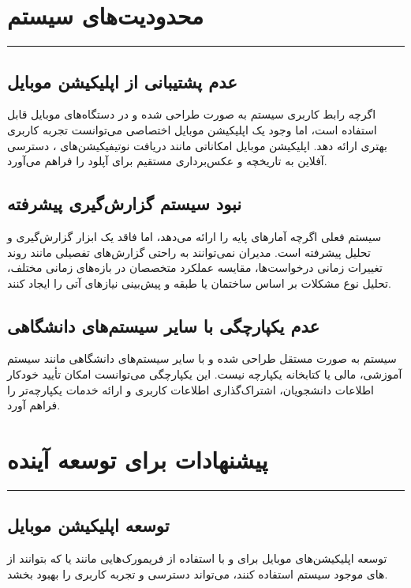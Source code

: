 \documentclass[12pt,a4paper]{report}
\begin{document}
	\section{محدودیت‌های سیستم}
	\noindent\rule{\textwidth}{0.4pt}
	
	\subsection{عدم پشتیبانی از اپلیکیشن موبایل}
	
	اگرچه رابط کاربری سیستم به صورت  طراحی شده و در دستگاه‌های موبایل قابل استفاده است، اما وجود یک اپلیکیشن موبایل اختصاصی می‌توانست تجربه کاربری بهتری ارائه دهد. اپلیکیشن موبایل امکاناتی مانند دریافت نوتیفیکیشن‌های ، دسترسی آفلاین به تاریخچه و عکس‌برداری مستقیم برای آپلود را فراهم می‌آورد.
	
	\subsection{نبود سیستم گزارش‌گیری پیشرفته}
	
	سیستم فعلی اگرچه آمارهای پایه را ارائه می‌دهد، اما فاقد یک ابزار گزارش‌گیری و تحلیل پیشرفته است. مدیران نمی‌توانند به راحتی گزارش‌های تفصیلی مانند روند تغییرات زمانی درخواست‌ها، مقایسه عملکرد متخصصان در بازه‌های زمانی مختلف، تحلیل نوع مشکلات بر اساس ساختمان یا طبقه و پیش‌بینی نیازهای آتی را ایجاد کنند.
	
	\subsection{عدم یکپارچگی با سایر سیستم‌های دانشگاهی}
	
	سیستم به صورت مستقل طراحی شده و با سایر سیستم‌های دانشگاهی مانند سیستم آموزشی، مالی یا کتابخانه یکپارچه نیست. این یکپارچگی می‌توانست امکان تأیید خودکار اطلاعات دانشجویان، اشتراک‌گذاری اطلاعات کاربری و ارائه خدمات یکپارچه‌تر را فراهم آورد.
	
	\section{پیشنهادات برای توسعه آینده}
	\noindent\rule{\textwidth}{0.4pt}
	
	\subsection{توسعه اپلیکیشن موبایل}
	
	توسعه اپلیکیشن‌های موبایل برای  و  با استفاده از فریمورک‌هایی مانند  یا  که بتوانند از های موجود سیستم استفاده کنند، می‌تواند دسترسی و تجربه کاربری را بهبود بخشد.
	
\end{document}
